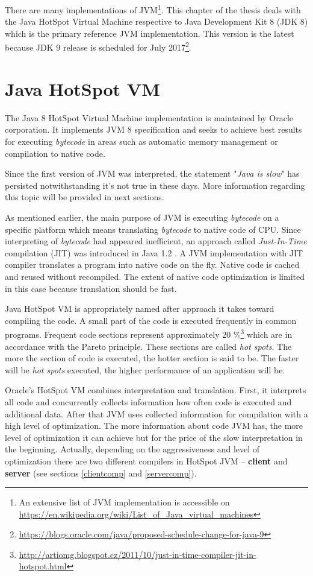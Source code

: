 \documentclass[
  digital, %
  oneside,
  notable, %
  nolof,     %
  nolot     %
]{fithesis3}
\begin{document}
There are many implementations of JVM\footnote{An extensive list of JVM implementation is accessible on \url{https://en.wikipedia.org/wiki/List_of_Java_virtual_machines}}. This chapter of the thesis deals with the Java HotSpot Virtual Machine respective to Java Development Kit 8 (JDK 8) which is the primary reference JVM implementation. This version is the latest because JDK 9 release is scheduled for July 2017\footnote{\url{https://blogs.oracle.com/java/proposed-schedule-change-for-java-9}}.

\section{Java HotSpot VM}
The Java 8 HotSpot Virtual Machine implementation is maintained by Oracle corporation. It implements JVM 8 specification and seeks to achieve best results for executing \textit{bytecode} in areas such as automatic memory management or compilation to native code.

Since the first version of JVM was interpreted, the statement "\textit{Java is slow}" has persisted notwithstanding it's not true in these days. More information regarding this topic will be provided in next sections.

As mentioned earlier, the main purpose of JVM is executing \textit{bytecode} on a specific platform which means translating \textit{bytecode} to native code of CPU. Since interpreting of \textit{bytecode} had appeared inefficient, an approach called \textit{Just-In-Time} compilation (JIT) was introduced in Java 1.2 \cite{javavsc}. A JVM implementation with JIT compiler translates a program into native code on the fly. Native code is cached and reused without recompiled. The extent of native code optimization is limited in this case because translation should be fast.

Java HotSpot VM is appropriately named after approach it takes toward compiling the code. A small part of the code is executed frequently in common programs. Frequent code sections represent approximately 20 \%\footnote{\url{http://artiomg.blogspot.cz/2011/10/just-in-time-compiler-jit-in-hotspot.html}} which are in accordance with the Pareto principle. These sections are called \textit{hot spots}. The more the section of code is executed, the hotter section is said to be. The faster will be \textit{hot spots} executed, the higher performance of an application will be. \cite{scott}

Oracle's HotSpot VM combines interpretation and translation. First, it interprets all code and concurrently collects information how often code is executed and additional data. After that JVM uses collected information for compilation with a high level of optimization. The more information about code JVM has, the more level of optimization it can achieve but for the price of the slow interpretation in the beginning. Actually, depending on the aggressiveness and level of optimization there are two different compilers in HotSpot JVM -- \textbf{client} and \textbf{server} (see sections \ref{clientcomp} and \ref{servercomp}).
\end{document}
